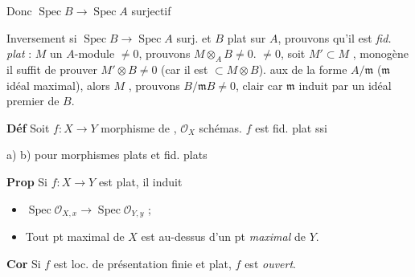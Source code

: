 \documentclass[11pt,a4paper]{article}
\begin{document}
Donc $\operatorname{Spec} B \to \operatorname{Spec} A$ surjectif

Inversement si $\operatorname{Spec} B \to \operatorname{Spec} A$ surj. et $B$ plat sur $A$, prouvons qu'il est \emph{fid. plat} : $M$ un $A$-module $\neq 0$, prouvons $M \otimes_A B \neq 0$.  $\neq 0$, soit $M' \subset M$ , monogène  il suffit de prouver $M' \otimes B \neq 0$ (car il est $\subset M \otimes B$).  aux  de la forme $A/\mathfrak{m}$ ($\mathfrak{m}$ idéal maximal), alors \struck{\ill{}} $M$ , prouvons  $B/\mathfrak{m}B \neq 0$, clair car $\mathfrak{m}$ induit par un idéal premier de $B$.

\textbf{Déf} Soit $f : X \to Y$ morphisme de  ,  \ill{} $\mathcal{O}_X$ schémas.   $f$ est fid. plat ssi 

a) b) pour morphismes plats et fid. plats

\textbf{Prop} Si $f : X \to Y$ est plat, il induit  

\begin{itemize}
  \item[a)] $\operatorname{Spec} \mathcal{O}_{X,x} \to \operatorname{Spec} \mathcal{O}_{Y,y}$ ;
  \item[b)] Tout pt maximal de $X$ est au-dessus d'un pt \emph{maximal} de $Y$.
\end{itemize}



\textbf{Cor} Si $f$ est loc. de présentation finie et plat, $f$ est  \emph{ouvert}.
\end{document}
